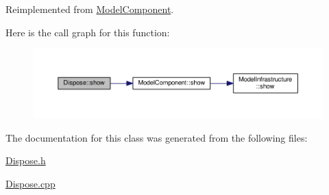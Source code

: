 Reimplemented from \hyperlink{class_model_component_ad8bc846e36b028eab7efb7da6c549eca}{Model\-Component}.



Here is the call graph for this function\-:
\nopagebreak
\begin{figure}[H]
\begin{center}
\leavevmode
\includegraphics[width=350pt]{class_dispose_aee8ef98d5ca22eb18a97b258ed059865_cgraph}
\end{center}
\end{figure}




The documentation for this class was generated from the following files\-:\begin{DoxyCompactItemize}
\item 
\hyperlink{_dispose_8h}{Dispose.\-h}\item 
\hyperlink{_dispose_8cpp}{Dispose.\-cpp}\end{DoxyCompactItemize}
